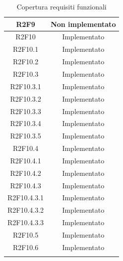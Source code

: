 \begin{longtable}{|c|c|}
	{R2F9} & Non implementato\\
	\hline
	{R2F10} & Implementato\\
	\hline
	{R2F10.1} & Implementato\\
	\hline
	{R2F10.2} & Implementato\\
	\hline
	{R2F10.3} & Implementato\\  
	\hline
	{R2F10.3.1} & Implementato\\ 
	\hline
	{R2F10.3.2} & Implementato \\ 
	\hline
	{R2F10.3.3} & Implementato \\ 
	\hline
	{R2F10.3.4} & Implementato \\
	\hline                              
	{R2F10.3.5} & Implementato\\
	\hline
	{R2F10.4} & Implementato\\
	\hline
	{R2F10.4.1} & Implementato\\
	\hline
	{R2F10.4.2} & Implementato\\
	\hline
	{R2F10.4.3} & Implementato\\
	\hline
	{R2F10.4.3.1} & Implementato\\
	\hline
	{R2F10.4.3.2} & Implementato\\
	\hline
	{R2F10.4.3.3} & Implementato\\
	\hline
	{R2F10.5} & Implementato\\
	\hline
	{R2F10.6} & Implementato\\
	\hline
	\caption[Copertura requisiti funzionali]{Copertura requisiti funzionali}
	\label{}
\end{longtable}
\renewcommand{\arraystretch}{1}

\newpage
